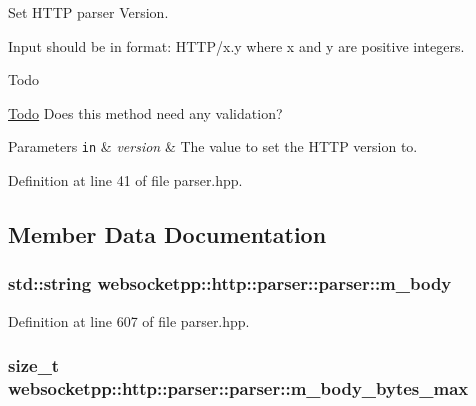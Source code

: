 Set H\+T\+T\+P parser Version. 

Input should be in format\+: H\+T\+T\+P/x.\+y where x and y are positive integers. \begin{DoxyRefDesc}{Todo}
\item[\hyperlink{todo__todo000013}{Todo}]Does this method need any validation?\end{DoxyRefDesc}



\begin{DoxyParams}[1]{Parameters}
\mbox{\tt in}  & {\em version} & The value to set the H\+T\+T\+P version to. \\
\hline
\end{DoxyParams}


Definition at line 41 of file parser.\+hpp.



\subsection{Member Data Documentation}
\hypertarget{classwebsocketpp_1_1http_1_1parser_1_1parser_a2a552a4581ae26674fd6d566e5b332ee}{}
\subsubsection[{m\+\_\+body}]{\setlength{\rightskip}{0pt plus 5cm}std\+::string websocketpp\+::http\+::parser\+::parser\+::m\+\_\+body\hspace{0.3cm}{\ttfamily [protected]}}\label{classwebsocketpp_1_1http_1_1parser_1_1parser_a2a552a4581ae26674fd6d566e5b332ee}


Definition at line 607 of file parser.\+hpp.

\hypertarget{classwebsocketpp_1_1http_1_1parser_1_1parser_a85613c9d20e308ff343449852b7e769f}{}
\subsubsection[{m\+\_\+body\+\_\+bytes\+\_\+max}]{\setlength{\rightskip}{0pt plus 5cm}size\+\_\+t websocketpp\+::http\+::parser\+::parser\+::m\+\_\+body\+\_\+bytes\+\_\+max\hspace{0.3cm}{\ttfamily [protected]}}\label{classwebsocketpp_1_1http_1_1parser_1_1parser_a85613c9d20e308ff343449852b7e769f}


